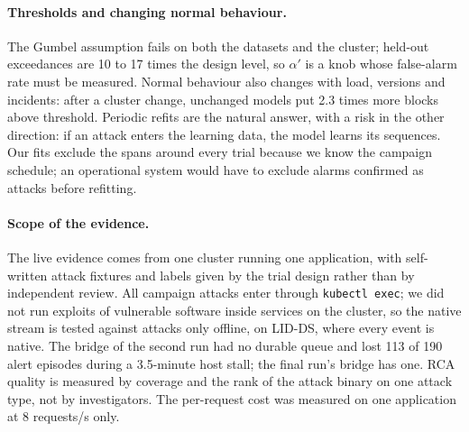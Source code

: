\paragraph{Thresholds and changing normal behaviour.} The Gumbel assumption fails on both the datasets and the
cluster; held-out exceedances are 10 to 17 times the design level, so $\alpha'$ is a knob whose false-alarm rate must be
measured. Normal behaviour also changes with load, versions and incidents: after a cluster change, unchanged models put
2.3 times more blocks above threshold. Periodic refits are the natural answer, with a risk in the other direction: if an
attack enters the learning data, the model learns its sequences. Our fits exclude the spans around every trial because
we know the campaign schedule; an operational system would have to exclude alarms confirmed as attacks before refitting.

\paragraph{Scope of the evidence.} The live evidence comes from one cluster running one application, with self-written
attack fixtures and labels given by the trial design rather than by independent review. All campaign attacks enter
through \texttt{kubectl exec}; we did not run exploits of vulnerable software inside services on the cluster, so the
native stream is tested against attacks only offline, on LID-DS, where every event is native. The bridge of the second run had no durable
queue and lost 113 of 190 alert episodes during a 3.5-minute host stall; the final run's bridge has one. RCA quality is measured by coverage and the
rank of the attack binary on one attack type, not by investigators. The per-request cost was measured on one application at 8 requests/s only.

